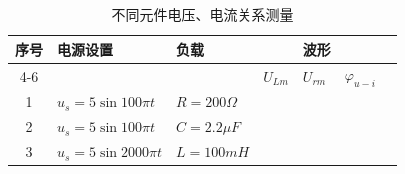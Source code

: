 \documentclass[12pt,a4paper]{article}
\begin{document}
\vspace{0.5cm}

\renewcommand{\arraystretch}{2.0}

\begin{table}[H]
\centering
\caption{不同元件电压、电流关系测量}
\label{tab:7-2}
\begin{tabular}{|c|>{\centering\arraybackslash}p{3.2cm}|>{\centering\arraybackslash}p{2.5cm}|>{\centering\arraybackslash}p{1.7cm}|>{\centering\arraybackslash}p{1.7cm}|>{\centering\arraybackslash}p{1.7cm}|>{\centering\arraybackslash}p{2cm}|}
\hline
序号 & 电源设置 & 负载 & \multicolumn{3}{c|}{电压幅值} & 波形 \\
\cline{4-6}
 &  &  & $U_{Lm}$ & $U_{rm}$ & $\varphi_{u-i}$ &  \\
\hline
1 & $u_s = 5\sin 100\pi t$ & $R=200\Omega$ & \rule{0pt}{3ex} & & & \\
\hline
2 & $u_s = 5\sin 100\pi t$ & $C=2.2\mu F$ & \rule{0pt}{3ex} & & & \\
\hline
3 & $u_s = 5\sin 2000\pi t$ & $L=100mH$ & \rule{0pt}{3ex} & & & \\
\hline
\end{tabular}
\end{table}
\end{document}
